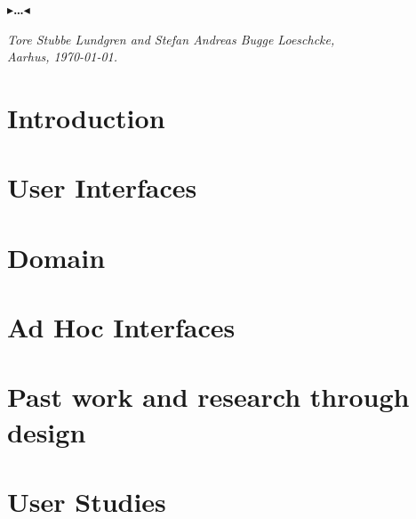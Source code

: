 \documentclass[oneside,11pt,openright]{report}
\newcommand{\todo}[1]{{\color[rgb]{.5,0,0}\textbf{$\blacktriangleright$#1$\blacktriangleleft$}}}
\begin{document}
{\todo{\dots}

\vspace{2ex}
\begin{flushright}
  \emph{Tore Stubbe Lundgren and Stefan Andreas Bugge Loeschcke,}\\
  \emph{Aarhus, \today.}
\end{flushright}

\tableofcontents
{}
\setcounter{secnumdepth}{2}




\listoffigures

\chapter{Introduction}
\label{ch:intro}


\chapter{User Interfaces}
\label{ch:ui}


\chapter{Domain}
\label{ch:domain}


\chapter{Ad Hoc Interfaces}
\label{ch:adhoc}


\chapter{Past work and research through design}
\label{ch:kickoff}


\chapter{User Studies}
\label{ch:workshops}


}
\end{document}
